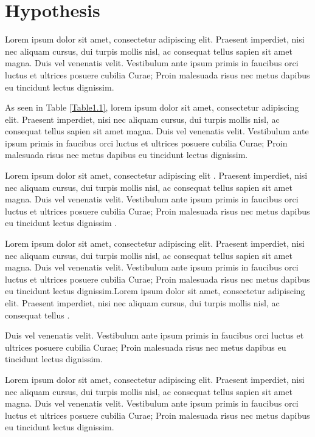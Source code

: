 \section{Hypothesis}

Lorem ipsum dolor sit amet, consectetur adipiscing elit. Praesent imperdiet, nisi nec aliquam cursus, dui turpis mollis nisl, ac consequat tellus sapien sit amet magna. Duis vel venenatis velit. Vestibulum ante ipsum primis in faucibus orci luctus et ultrices posuere cubilia Curae; Proin malesuada risus nec metus dapibus eu tincidunt lectus dignissim. 

As seen in Table \ref{Table1.1}, lorem ipsum dolor sit amet, consectetur adipiscing elit. Praesent imperdiet, nisi nec aliquam cursus, dui turpis mollis nisl, ac consequat tellus sapien sit amet magna. Duis vel venenatis velit. Vestibulum ante ipsum primis in faucibus orci luctus et ultrices posuere cubilia Curae; Proin malesuada risus nec metus dapibus eu tincidunt lectus dignissim. 

Lorem ipsum dolor sit amet, consectetur adipiscing elit \cite{harper2007}. Praesent imperdiet, nisi nec aliquam cursus, dui turpis mollis nisl, ac consequat tellus sapien sit amet magna. Duis vel venenatis velit. Vestibulum ante ipsum primis in faucibus orci luctus et ultrices posuere cubilia Curae; Proin malesuada risus nec metus dapibus eu tincidunt lectus dignissim \cite{unesco}.

Lorem ipsum dolor sit amet, consectetur adipiscing elit. Praesent imperdiet, nisi nec aliquam cursus, dui turpis mollis nisl, ac consequat tellus sapien sit amet magna. Duis vel venenatis velit. Vestibulum ante ipsum primis in faucibus orci 
luctus et ultrices posuere cubilia Curae; Proin malesuada risus nec metus dapibus eu tincidunt lectus dignissim.Lorem ipsum dolor sit amet, consectetur adipiscing elit. Praesent imperdiet, nisi nec aliquam cursus, dui turpis mollis nisl, ac consequat tellus \cite{mccaffrey88,moore91,nelson88,sisaky,simpsondvd,startrek,TS-40561,url-1,url-2,vanden2001}.

Duis vel venenatis velit. Vestibulum ante ipsum primis in faucibus orci luctus et ultrices posuere cubilia Curae; Proin malesuada risus nec metus dapibus eu tincidunt lectus dignissim.

Lorem ipsum dolor sit amet, consectetur adipiscing elit. Praesent imperdiet, nisi nec aliquam cursus, dui turpis mollis nisl, ac consequat tellus sapien sit amet magna. Duis vel venenatis velit. Vestibulum ante ipsum primis in faucibus orci luctus et ultrices posuere cubilia Curae; Proin malesuada risus nec metus dapibus eu tincidunt lectus dignissim.

